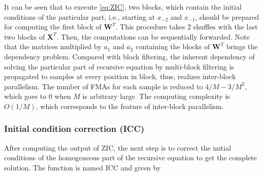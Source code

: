 It can be seen that to execute \eqref{eq:ZIC}, two blocks, which contain the initial conditions of the particular part, 
i.e., starting at $x_{-2}$ and $x_{-1}$, should be prepared for computing the first block of $\bm{W}^T$. 
This procedure takes 2 shuffles with the last two blocks of $\bm{X}^T$.
Then, the computations can be sequentially forwarded.
Note that the matrices multiplied by $a_1$ and $a_2$ containing the blocks of $\bm{W}^T$
brings the dependency problem. 
Compared with block filtering,
the inherent dependency of solving the particular part of recursive equation by multi-block filtering
is propagated to samples at every position in block, thus, realizes inter-block parallelism.
The number of FMAs for each sample is reduced to $4/M{-}3/M^2$, which goes to 0 when $M$ is arbitrary large.
The computing complexity is $O(1/M)$, which corres\-ponds to the feature of inter-block parallelism.



\subsubsection{Initial condition correction (ICC)}

After computing the output of ZIC, the next step is to 
correct the initial conditions of the homogeneous part of the recursive equation to get the complete solution.
The function is named ICC and given by

